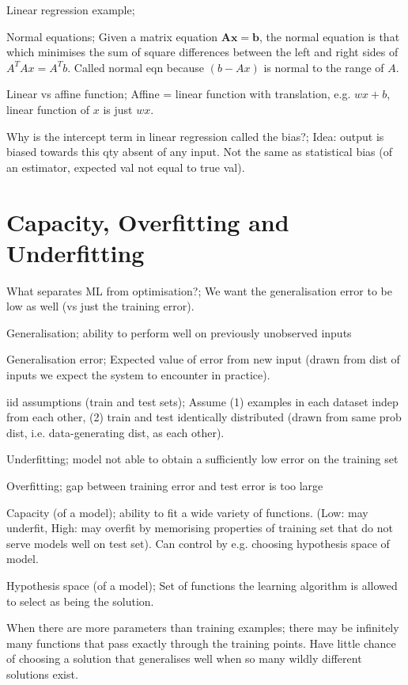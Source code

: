 \documentclass{article}
\begin{document}
Linear regression example;

Normal equations; Given a matrix equation $\mathbf{Ax}=\mathbf{b}$, the normal equation is that which minimises the sum of square differences between the left and right sides of $A^TAx=A^Tb$. \newline Called normal eqn because $(b-Ax)$ is normal to the range of $A$.

Linear vs affine function; Affine = linear function with translation, e.g. $wx+b$, linear function of $x$ is just $wx$. 

Why is the intercept term in linear regression called the bias?; Idea: output is biased towards this qty absent of any input. \newline Not the same as statistical bias (of an estimator, expected val not equal to true val).

\section{Capacity, Overfitting and Underfitting}

What separates ML from optimisation?; We want the generalisation error to be low as well (vs just the training error).

Generalisation; ability to perform well on previously unobserved inputs

Generalisation error; Expected value of error from new input (drawn from dist of inputs we expect the system to encounter in practice).

iid assumptions (train and test sets); Assume (1) examples in each dataset indep from each other, (2) train and test identically distributed (drawn from same prob dist, i.e. data-generating dist, as each other).

Underfitting; model not able to obtain a sufficiently low error on the training set

Overfitting; gap between training error and test error is too large

Capacity (of a model); ability to fit a wide variety of functions. (Low: may underfit, High: may overfit by memorising properties of training set that do not serve models well on test set). \newline Can control by e.g. choosing hypothesis space of model.

Hypothesis space (of a model); Set of functions the learning algorithm is allowed to select as being the solution.

When there are more parameters than training examples; there may be infinitely many functions that pass exactly through the training points. \newline Have little chance of choosing a solution that generalises well when so many wildly different solutions exist.
\end{document}
